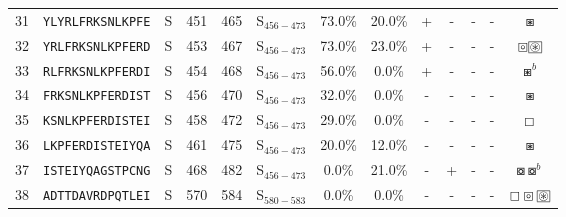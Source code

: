 \begin{tabular}{rcccccccccccc}
31 &  \texttt{YLYRLFRKSNLKPFE} &       S &    451 &   465 &  S$_{456-473}$ &                          73.0\% &                           20.0\% &          + &           - &          - &           - &                                                                                                             $ \boxast $ \\
32 &  \texttt{YRLFRKSNLKPFERD} &       S &    453 &   467 &  S$_{456-473}$ &                          73.0\% &                           23.0\% &          + &           - &          - &           - &                                                          $ \boxcircle \setlength{\fboxsep}{0.5pt} \boxed{\circledast} $ \\
33 &  \texttt{RLFRKSNLKPFERDI} &       S &    454 &   468 &  S$_{456-473}$ &                          56.0\% &                            0.0\% &          + &           - &          - &           - &                                                                                                           $ \boxast^b $ \\
34 &  \texttt{FRKSNLKPFERDIST} &       S &    456 &   470 &  S$_{456-473}$ &                          32.0\% &                            0.0\% &          - &           - &          - &           - &                                                                                                             $ \boxast $ \\
35 &  \texttt{KSNLKPFERDISTEI} &       S &    458 &   472 &  S$_{456-473}$ &                          29.0\% &                            0.0\% &          - &           - &          - &           - &                                                                                                           $ \boxempty $ \\
36 &  \texttt{LKPFERDISTEIYQA} &       S &    461 &   475 &  S$_{456-473}$ &                          20.0\% &                           12.0\% &          - &           - &          - &           - &                                                                                                             $ \boxast $ \\
37 &  \texttt{ISTEIYQAGSTPCNG} &       S &    468 &   482 &  S$_{456-473}$ &                           0.0\% &                           21.0\% &          - &           + &          - &           - &                                                                                             $ \boxcircle \boxcircle^b $ \\
38 &  \texttt{ADTTDAVRDPQTLEI} &       S &    570 &   584 &  S$_{580-583}$ &                           0.0\% &                            0.0\% &          - &           - &          - &           - &                                                $ \boxempty \boxcircle \setlength{\fboxsep}{0.5pt} \boxed{\circledast} $ \\

\end{tabular}
